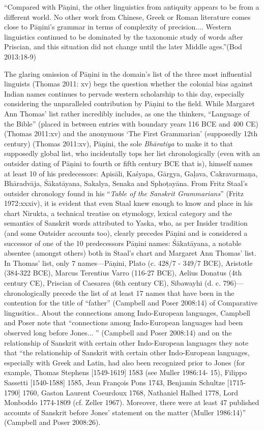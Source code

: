 \begin{myquote}
“Compared with Pāṇini, the other linguistics from antiquity appears to be from a different world. No other work from Chinese, Greek or Roman literature comes close to Pāṇini’s grammar in terms of complexity of precision.... Western linguistics continued to be dominated by the taxonomic study of words after Priscian, and this situation did not change until the later Middle ages.”\hfill (Bod 2013:18-9)
\end{myquote}

The glaring omission of Pāṇini in the domain’s list of the three most influential linguists (Thomas 2011: xv) begs the question whether the colonial bias against Indian names continues to pervade western scholarship to this day, especially considering the unparalleled contribution by Pāṇini to the field. While Margaret Ann Thomas’ list rather incredibly includes, as one the thinkers, “Language of the Bible” (placed in between entries with boundary years 116 BCE and 400 CE) (Thomas 2011:xv) and the anonymous ‘The First Grammarian’ (supposedly 12th century) (Thomas 2011:xv), Pāṇini, the sole \textit{Bhāratiya} to make it to that supposedly global list, who incidentally tops her list chronologically (even with an outsider dating of Pāṇini to fourth or fifth century BCE that is), himself names at least 10 of his predecessors: Apisāli, Kaśyapa, Gārgya, Gaḷava, Cakravarmaṇa, Bhāradvāja, Śākatāyana, Sakalya, Senaka and Sphoṭayāna. From Fritz Staal’s outsider chronology found in his “\textit{Table of the Sanskrit Grammarians}” (Fritz 1972:xxxiv), it is evident that even Staal knew enough to know and place in his chart Nirukta, a technical treatise on etymology, lexical category and the semantics of Sanskrit words attributed to Yaska, who, as per Insider tradition (and some Outsider accounts too), clearly precedes Pāṇini and is considered a successor of one of the 10 predecessors Pāṇini names: Śākatāyana, a notable absentee (amongst others) both in Staal’s chart and Margaret Ann Thomas’ list. In Thomas’ list, only 7 names—Pāṇini, Plato (c. 428/7 - 349/7 BCE), Aristotle (384-322 BCE), Marcus Terentius Varro (116-27 BCE), Aelius Donatus (4th century CE), Priscian of Caesarea (6th century CE), Sibawayhi (d. c. 796)—chronologically precede the list of at least 17 names that have been in the contention for the title of “father” (Campbell and Poser 2008:14) of Comparative lingusitics.. About the connections among Indo-European languages, Campbell and Poser note that “connections among Indo-European languages had been observed long before Jones... ” (Campbell and Poser 2008:14) and on the relationship of Sanskrit with certain other Indo-European languages they note that “the relationship of Sanskrit with certain other Indo-European languages, especially with Greek and Latin, had also been recognized prior to Jones (for example, Thomas Stephens [1549-1619] 1583 (see Muller 1986:14- 15), Filippo Sassetti [1540-1588] 1585, Jean François Pons 1743, Benjamin Schultze [1715-1790] 1760, Gaston Laurent Coeurdoux 1768, Nathaniel Halhed 1778, Lord Monboddo 1774-1809 (cf. Zeller 1967). Moreover, there were at least 47 published accounts of Sanskrit before Jones’ statement on the matter (Muller 1986:14)” (Campbell and Poser 2008:26). 